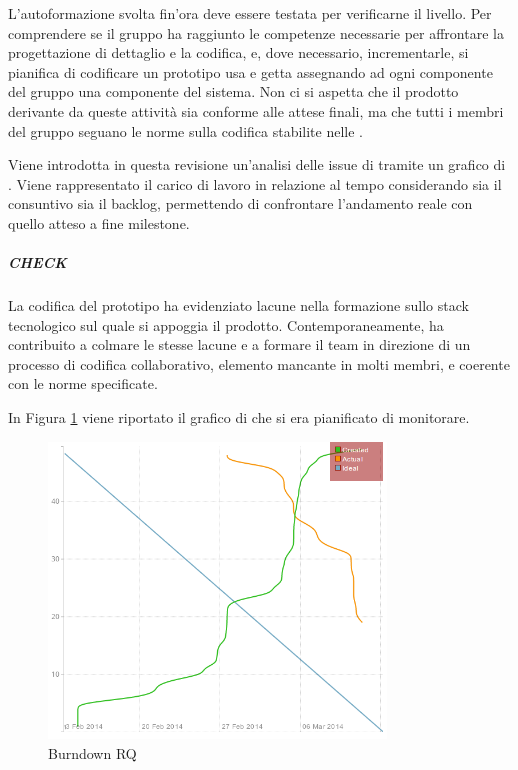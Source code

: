 	L'autoformazione svolta fin'ora deve essere testata per verificarne il livello. Per comprendere se il gruppo ha raggiunto le competenze necessarie per affrontare la progettazione di dettaglio e la codifica, e, dove necessario, incrementarle, si pianifica di codificare un prototipo usa e getta assegnando ad ogni componente del gruppo una componente del sistema. Non ci si aspetta che il prodotto derivante da queste attività sia conforme alle attese finali, ma che tutti i membri del gruppo seguano le norme sulla codifica stabilite nelle \NormeDiProgetto{}.
	
	Viene introdotta in questa revisione un'analisi delle issue di  tramite un grafico di . Viene rappresentato il carico di lavoro in relazione al tempo considerando sia il consuntivo sia il backlog, permettendo di confrontare l'andamento reale con quello atteso a fine milestone.
	
	\subparagraph{CHECK}
	La codifica del prototipo ha evidenziato lacune nella formazione sullo stack tecnologico sul quale si appoggia il prodotto. Contemporaneamente, ha contribuito a colmare le stesse lacune e a formare il team in direzione di un processo di codifica collaborativo, elemento mancante in molti membri, e coerente con le norme specificate.

	In Figura \ref{fig:burndownRQ} viene riportato il grafico di  che si era pianificato di monitorare.
	
	\begin{figure}[H]
		\centering \includegraphics[width=0.8\textwidth]{burndownRQ.png}
		\caption{Burndown RQ}
		\label{fig:burndownRQ}
	\end{figure}
	
